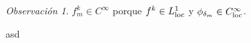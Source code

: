 \documentclass{article}
\newcommand{\local}{\textnormal{loc}}
\theoremstyle{remark}
\newtheorem{remark}{Observación}
\begin{document}
\begin{remark}
  \(f^k_m \in C^{\infty}\) porque \(f^k \in L^1_{\local}\) y \(\phi_{\delta_m} \in C^{\infty}_{\local}\).
\end{remark}











\newpage
asd
\end{document}
